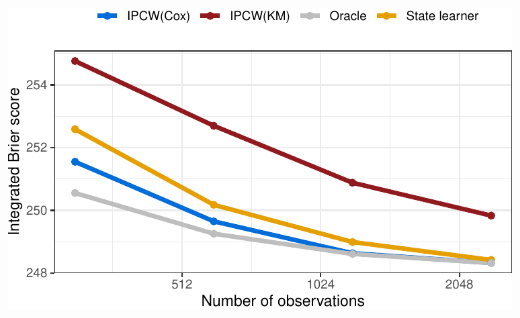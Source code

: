 \documentclass[a0,portrait]{a0poster}
\newcommand{\1}{\mathds{1}}
\begin{document}
\begin{minipage}{\textwidth}
\begin{minipage}[t]{1\linewidth}
\begin{multicols}{2}
\begin{multicols}{2}
  \vfill\null \columnbreak
  
  \begin{center}
    \includegraphics[width=1\linewidth]{experiment-fig-sl-ipcw.pdf}
    \vspace{-12.4cm}
      \label{fig:sim-fig}
\end{center}

\end{multicols}

\vspace{-1em}

\setlength{\columnseprule}{0pt}
\setlength{\columnsep}{30pt}
\begin{multicols}{2}
  

\end{multicols}
\end{multicols}
\end{minipage}
\end{minipage}
\end{document}
